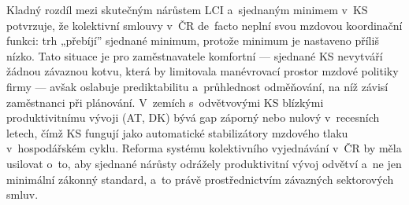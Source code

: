 Kladný rozdíl mezi skutečným nárůstem \ac{LCI} a~sjednaným minimem v~\ac{KS} potvrzuje, že kolektivní smlouvy v~ČR de~facto neplní svou mzdovou koordinační funkci: trh „přebíjí” sjednané minimum, protože minimum je nastaveno příliš nízko.
Tato situace je pro zaměstnavatele komfortní --- sjednané \ac{KS} nevytváří žádnou závaznou kotvu, která by limitovala manévrovací prostor mzdové politiky firmy --- avšak oslabuje prediktabilitu a~průhlednost odměňování, na níž závisí zaměstnanci při plánování.
V~zemích s~odvětvovými \ac{KS} blízkými produktivitnímu vývoji (AT, DK) bývá gap záporný nebo nulový v~recesních letech, čímž \ac{KS} fungují jako automatické stabilizátory mzdového tlaku v~hospodářském cyklu.
Reforma systému kolektivního vyjednávání v~ČR by měla usilovat o~to, aby sjednané nárůsty odrážely produktivitní vývoj odvětví a~ne jen minimální zákonný standard, a~to právě prostřednictvím závazných sektorových smluv.


